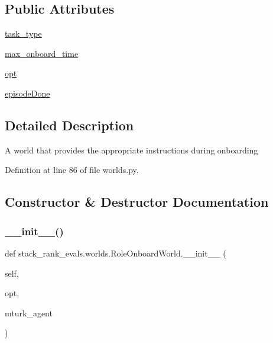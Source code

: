 \subsection*{Public Attributes}
\begin{DoxyCompactItemize}
\item 
\hyperlink{classstack__rank__evals_1_1worlds_1_1RoleOnboardWorld_af8109c2ced237355a055ad67e7436a65}{task\+\_\+type}
\item 
\hyperlink{classstack__rank__evals_1_1worlds_1_1RoleOnboardWorld_a66d9e43741be6eee3262e5ffc47fb147}{max\+\_\+onboard\+\_\+time}
\item 
\hyperlink{classstack__rank__evals_1_1worlds_1_1RoleOnboardWorld_a986c8464db53b9d32da815609b44392d}{opt}
\item 
\hyperlink{classstack__rank__evals_1_1worlds_1_1RoleOnboardWorld_a80faeeeacacbf4babca6b7a66d6716bd}{episode\+Done}
\end{DoxyCompactItemize}


\subsection{Detailed Description}
\begin{DoxyVerb}A world that provides the appropriate instructions during onboarding\end{DoxyVerb}
 

Definition at line 86 of file worlds.\+py.



\subsection{Constructor \& Destructor Documentation}
\mbox{\label{classstack__rank__evals_1_1worlds_1_1RoleOnboardWorld_a93c85daae3056c33bc77b6159ce43b57}} 
\subsubsection{\texorpdfstring{\+\_\+\+\_\+init\+\_\+\+\_\+()}{\_\_init\_\_()}\hspace{0.1cm}{\footnotesize\ttfamily [1/2]}}
{\footnotesize\ttfamily def stack\+\_\+rank\+\_\+evals.\+worlds.\+Role\+Onboard\+World.\+\_\+\+\_\+init\+\_\+\+\_\+ (\begin{DoxyParamCaption}\item[{}]{self,  }\item[{}]{opt,  }\item[{}]{mturk\+\_\+agent }\end{DoxyParamCaption})}



